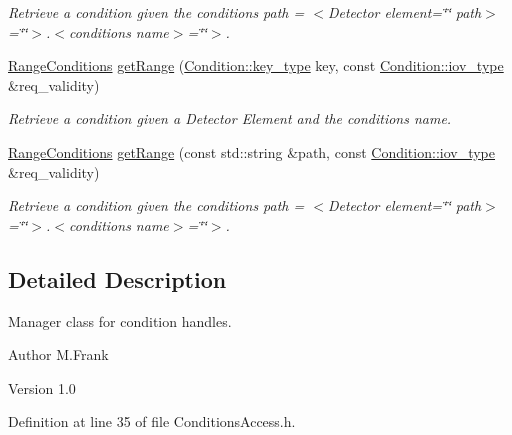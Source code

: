 \begin{DoxyCompactItemize}
\begin{DoxyCompactList}\small\item\em Retrieve a condition given the conditions path = $<$Detector element=\char`\"{}\char`\"{} path$>$=\char`\"{}\char`\"{}$>$.$<$conditions name$>$=\char`\"{}\char`\"{}$>$. \item\end{DoxyCompactList}\item 
\hyperlink{namespace_d_d4hep_1_1_conditions_ae765f0140a33973a430280f02b6062f4}{RangeConditions} \hyperlink{class_d_d4hep_1_1_conditions_1_1_conditions_access_aa5f5712c3083cec42a3cd49d86924611}{getRange} (\hyperlink{class_d_d4hep_1_1_conditions_1_1_condition_a7528efa762e8cc072ef80ea67c3531f9}{Condition::key\_\-type} key, const \hyperlink{class_d_d4hep_1_1_i_o_v}{Condition::iov\_\-type} \&req\_\-validity)
\begin{DoxyCompactList}\small\item\em Retrieve a condition given a Detector Element and the conditions name. \item\end{DoxyCompactList}\item 
\hyperlink{namespace_d_d4hep_1_1_conditions_ae765f0140a33973a430280f02b6062f4}{RangeConditions} \hyperlink{class_d_d4hep_1_1_conditions_1_1_conditions_access_a44bbed9e32bd8ffe16319a83556571dd}{getRange} (const std::string \&path, const \hyperlink{class_d_d4hep_1_1_i_o_v}{Condition::iov\_\-type} \&req\_\-validity)
\begin{DoxyCompactList}\small\item\em Retrieve a condition given the conditions path = $<$Detector element=\char`\"{}\char`\"{} path$>$=\char`\"{}\char`\"{}$>$.$<$conditions name$>$=\char`\"{}\char`\"{}$>$. \item\end{DoxyCompactList}\end{DoxyCompactItemize}


\subsection{Detailed Description}
Manager class for condition handles. \begin{DoxyAuthor}{Author}
M.Frank 
\end{DoxyAuthor}
\begin{DoxyVersion}{Version}
1.0 
\end{DoxyVersion}


Definition at line 35 of file ConditionsAccess.h.

